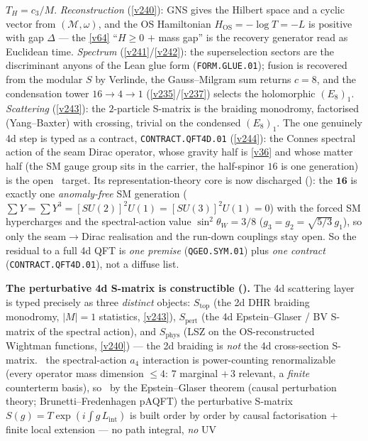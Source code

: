 $T_H=c_3/M$. \emph{Reconstruction} (\vref{v240}): GNS gives the Hilbert space and a
cyclic vector from $(\mathcal M,\omega)$, and the OS Hamiltonian
$H_{\mathrm{OS}}=-\log T=-L$ is positive with gap $\Delta$ --- the \vref{v64}
``$H\ge0$ $+$ mass gap'' is the recovery generator read as Euclidean time.
\emph{Spectrum} (\vref{v241}/\vref{v242}): the superselection sectors are the
discriminant anyons of the Lean glue form (\texttt{FORM.GLUE.01}); fusion is
recovered from the modular $S$ by Verlinde, the Gauss--Milgram sum returns $c=8$,
and the condensation tower $16\to4\to1$ (\vref{v235}/\vref{v237}) selects the
holomorphic $(E_8)_1$. \emph{Scattering} (\vref{v243}): the $2$-particle S-matrix is
the braiding monodromy, factorised (Yang--Baxter) with crossing, trivial on the
condensed $(E_8)_1$. The one genuinely 4d step is typed as a contract,
\texttt{CONTRACT.QFT4D.01} (\vref{v244}): the Connes spectral action of the seam
Dirac operator, whose gravity half is \vref{v36} and whose matter half (the SM
gauge group sits in the carrier, the half-spinor $16$ is one generation) is the
open \mO\ target. Its representation-theory core is now discharged
(): the $\mathbf{16}$ is exactly one
\emph{anomaly-free} SM generation ($\sum Y=\sum Y^3=[SU(2)]^2U(1)=[SU(3)]^2U(1)=0$)
with the forced SM hypercharges and the spectral-action value $\sin^2\theta_W=3/8$
($g_3=g_2=\sqrt{5/3}\,g_1$), so only the seam$\to$Dirac realisation and the
run-down couplings stay open. So the residual to a full 4d QFT is \emph{one premise}
(\texttt{QGEO.SYM.01}) plus \emph{one contract} (\texttt{CONTRACT.QFT4D.01}), not a
diffuse list.
\par\smallskip\noindent\textbf{The perturbative 4d S-matrix is constructible ().}
The 4d scattering layer is typed precisely as three \emph{distinct} objects: $S_{\mathrm{top}}$ (the 2d DHR
braiding monodromy, $|M|{=}1$ statistics, \vref{v243}), $S_{\mathrm{pert}}$ (the 4d Epstein--Glaser / BV
S-matrix of the spectral action), and $S_{\mathrm{phys}}$ (LSZ on the OS-reconstructed Wightman functions,
\vref{v240}) --- the 2d braiding is \emph{not} the 4d cross-section S-matrix. \mE\ the spectral-action $a_4$
interaction is power-counting renormalizable (every operator mass dimension $\le4$: $7$ marginal $+\,3$
relevant, a \emph{finite} counterterm basis), so \mC\ by the Epstein--Glaser theorem (causal perturbation
theory; Brunetti--Fredenhagen pAQFT) the perturbative S-matrix $S(g)=T\exp(i\!\int g\,L_{\mathrm{int}})$ is
built order by order by causal factorisation $+$ finite local extension --- no path integral, \emph{no} UV
